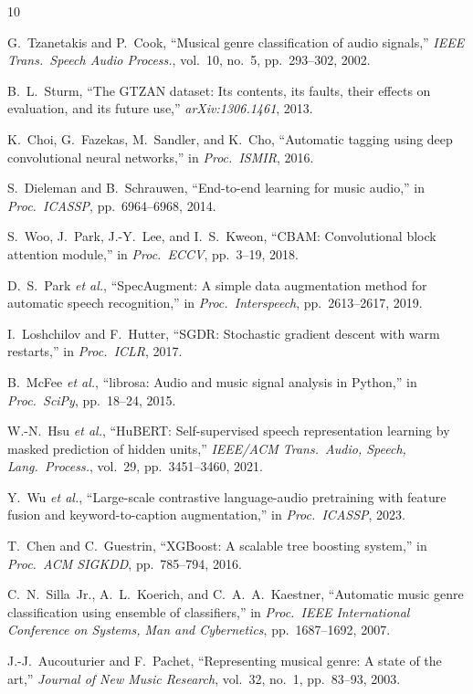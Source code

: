 {\small
\begin{thebibliography}{10}

G.~Tzanetakis and P.~Cook,
``Musical genre classification of audio signals,''
\emph{IEEE Trans.\ Speech Audio Process.}, vol.~10, no.~5, pp.~293--302, 2002.

B.~L.~Sturm,
``The GTZAN dataset: Its contents, its faults, their effects on evaluation, and its future use,''
\emph{arXiv:1306.1461}, 2013.

K.~Choi, G.~Fazekas, M.~Sandler, and K.~Cho,
``Automatic tagging using deep convolutional neural networks,''
in \emph{Proc.\ ISMIR}, 2016.

S.~Dieleman and B.~Schrauwen,
``End-to-end learning for music audio,''
in \emph{Proc.\ ICASSP}, pp.~6964--6968, 2014.

S.~Woo, J.~Park, J.-Y.~Lee, and I.~S.~Kweon,
``CBAM: Convolutional block attention module,''
in \emph{Proc.\ ECCV}, pp.~3--19, 2018.

D.~S.~Park \emph{et al.},
``SpecAugment: A simple data augmentation method for automatic speech recognition,''
in \emph{Proc.\ Interspeech}, pp.~2613--2617, 2019.

I.~Loshchilov and F.~Hutter,
``SGDR: Stochastic gradient descent with warm restarts,''
in \emph{Proc.\ ICLR}, 2017.

B.~McFee \emph{et al.},
``librosa: Audio and music signal analysis in Python,''
in \emph{Proc.\ SciPy}, pp.~18--24, 2015.

W.-N.~Hsu \emph{et al.},
``HuBERT: Self-supervised speech representation learning by masked prediction of hidden units,''
\emph{IEEE/ACM Trans.\ Audio, Speech, Lang.\ Process.}, vol.~29, pp.~3451--3460, 2021.

Y.~Wu \emph{et al.},
``Large-scale contrastive language-audio pretraining with feature fusion and keyword-to-caption augmentation,''
in \emph{Proc.\ ICASSP}, 2023.

T.~Chen and C.~Guestrin,
``XGBoost: A scalable tree boosting system,''
in \emph{Proc.\ ACM SIGKDD}, pp.~785--794, 2016.

C.~N.~Silla~Jr., A.~L.~Koerich, and C.~A.~A.~Kaestner,
``Automatic music genre classification using ensemble of classifiers,''
in \emph{Proc.\ IEEE International Conference on Systems, Man and Cybernetics}, pp.~1687--1692, 2007.

J.-J.~Aucouturier and F.~Pachet,
``Representing musical genre: A state of the art,''
\emph{Journal of New Music Research}, vol.~32, no.~1, pp.~83--93, 2003.

\end{thebibliography}
}

